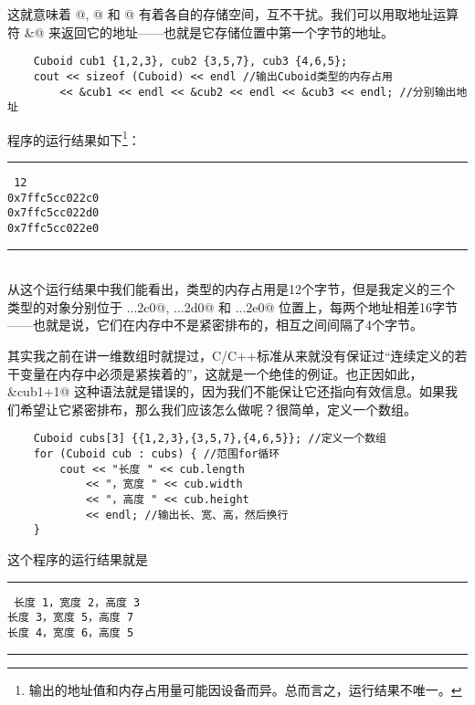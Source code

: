 这就意味着 @, @ 和 @ 有着各自的存储空间，互不干扰。我们可以用取地址运算符 \lstinline@&@ 来返回它的地址——也就是它存储位置中第一个字节的地址。\par
\begin{lstlisting}
    Cuboid cub1 {1,2,3}, cub2 {3,5,7}, cub3 {4,6,5};
    cout << sizeof (Cuboid) << endl //输出Cuboid类型的内存占用
        << &cub1 << endl << &cub2 << endl << &cub3 << endl; //分别输出地址
\end{lstlisting}
程序的运行结果如下\footnote{输出的地址值和内存占用量可能因设备而异。总而言之，运行结果不唯一。}：\\\noindent\rule{\linewidth}{.2pt}\texttt{
12\\
0x7ffc5cc022c0\\
0x7ffc5cc022d0\\
0x7ffc5cc022e0
}\\\noindent\rule{\linewidth}{.2pt}\\
从这个运行结果中我们能看出，\lstinline@Cuboid@ 类型的内存占用是12个字节，但是我定义的三个 \lstinline@Cuboid@ 类型的对象分别位于 \lstinline@...2c0@, \lstinline@...2d0@ 和 \lstinline@...2e0@ 位置上，每两个地址相差16字节——也就是说，它们在内存中不是紧密排布的，相互之间间隔了4个字节。\par
其实我之前在讲一维数组时就提过，C/C++标准从来就没有保证过``连续定义的若干变量在内存中必须是紧挨着的''，这就是一个绝佳的例证。也正因如此，\lstinline@&cub1+1@ 这种语法就是错误的，因为我们不能保让它还指向有效信息。如果我们希望让它紧密排布，那么我们应该怎么做呢？很简单，定义一个数组。
\begin{lstlisting}
    Cuboid cubs[3] {{1,2,3},{3,5,7},{4,6,5}}; //定义一个数组
    for (Cuboid cub : cubs) { //范围for循环
        cout << "长度 " << cub.length
            << "，宽度 " << cub.width
            << "，高度 " << cub.height
            << endl; //输出长、宽、高，然后换行
    }
\end{lstlisting}
这个程序的运行结果就是\\\noindent\rule{\linewidth}{.2pt}\texttt{
长度 1，宽度 2，高度 3\\
长度 3，宽度 5，高度 7\\
长度 4，宽度 6，高度 5
}\\\noindent\rule{\linewidth}{.2pt}
